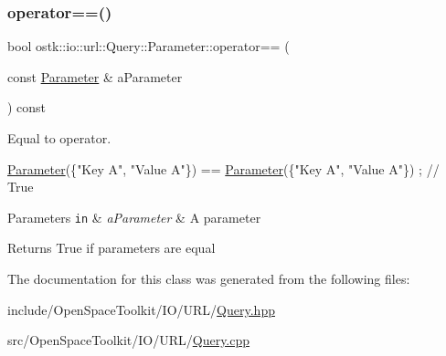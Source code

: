 \subsubsection{\texorpdfstring{operator==()}{operator==()}}
{\footnotesize\ttfamily bool ostk\+::io\+::url\+::\+Query\+::\+Parameter\+::operator== (\begin{DoxyParamCaption}\item[{const \hyperlink{classostk_1_1io_1_1url_1_1_query_1_1_parameter}{Parameter} \&}]{a\+Parameter }\end{DoxyParamCaption}) const}



Equal to operator. 


\begin{DoxyCode}
\hyperlink{classostk_1_1io_1_1url_1_1_query_1_1_parameter_a0206a88a6546df8ec49219db4a8db3f3}{Parameter}(\{\textcolor{stringliteral}{"Key A"}, \textcolor{stringliteral}{"Value A"}\}) == \hyperlink{classostk_1_1io_1_1url_1_1_query_1_1_parameter_a0206a88a6546df8ec49219db4a8db3f3}{Parameter}(\{\textcolor{stringliteral}{"Key A"}, \textcolor{stringliteral}{"Value A"}\}) ; \textcolor{comment}{// True}
\end{DoxyCode}



\begin{DoxyParams}[1]{Parameters}
\mbox{\tt in}  & {\em a\+Parameter} & A parameter \\
\hline
\end{DoxyParams}
\begin{DoxyReturn}{Returns}
True if parameters are equal 
\end{DoxyReturn}


The documentation for this class was generated from the following files\+:\begin{DoxyCompactItemize}
\item 
include/\+Open\+Space\+Toolkit/\+I\+O/\+U\+R\+L/\hyperlink{_query_8hpp}{Query.\+hpp}\item 
src/\+Open\+Space\+Toolkit/\+I\+O/\+U\+R\+L/\hyperlink{_query_8cpp}{Query.\+cpp}\end{DoxyCompactItemize}
